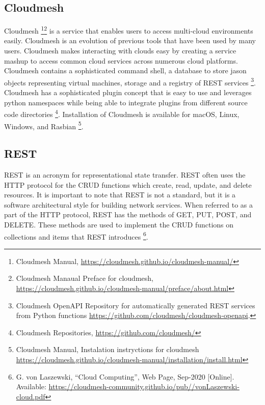 \subsection{Cloudmesh}\label{cloudmesh}

Cloudmesh \footnote{Cloudmesh Manual,
  \url{https://cloudmesh.github.io/cloudmesh-manual/}}\footnote{Cloudmesh
  Manaual Preface for cloudmesh,
  \url{https://cloudmesh.github.io/cloudmesh-manual/preface/about.html}}
is a service that enables users to access multi-cloud environments
easily. Cloudmesh is an evolution of previous tools that have been used
by many users. Cloudmesh makes interacting with clouds easy by creating
a service mashup to access common cloud services across numerous cloud
platforms. Cloudmesh contains a sophisticated command shell, a database
to store jason objects representing virtual machines, storage and a
registry of REST services \footnote{Cloudmesh OpenAPI Repository for
  automatically generated REST services from Python functions
  \url{https://github.com/cloudmesh/cloudmesh-openapi}.}. Cloudmesh has
a sophisticated plugin concept that is easy to use and leverages python
namespaces while being able to integrate plugins from different source
code directories \footnote{Cloudmesh Repositories,
  \url{https://github.com/cloudmesh/}}. Installation of Cloudmesh is
available for macOS, Linux, Windows, and Rasbian \footnote{Cloudmesh
  Manual, Instalation instryctions for cloudmesh
  \url{https://cloudmesh.github.io/cloudmesh-manual/installation/install.html}}.

\subsection{REST}\label{rest}

REST is an acronym for representational state transfer. REST often uses
the HTTP protocol for the CRUD functions which create, read, update, and
delete resources. It is important to note that REST is not a standard,
but it is a software architectural style for building network services.
When referred to as a part of the HTTP protocol, REST has the methods of
GET, PUT, POST, and DELETE. These methods are used to implement the CRUD
functions on collections and items that REST introduces \footnote{G. von
  Laszewski, ``Cloud Computing'', Web Page, Sep-2020 {[}Online{]}.
  Available:
  \url{https://cloudmesh-community.github.io/pub//vonLaszewski-cloud.pdf}}.

